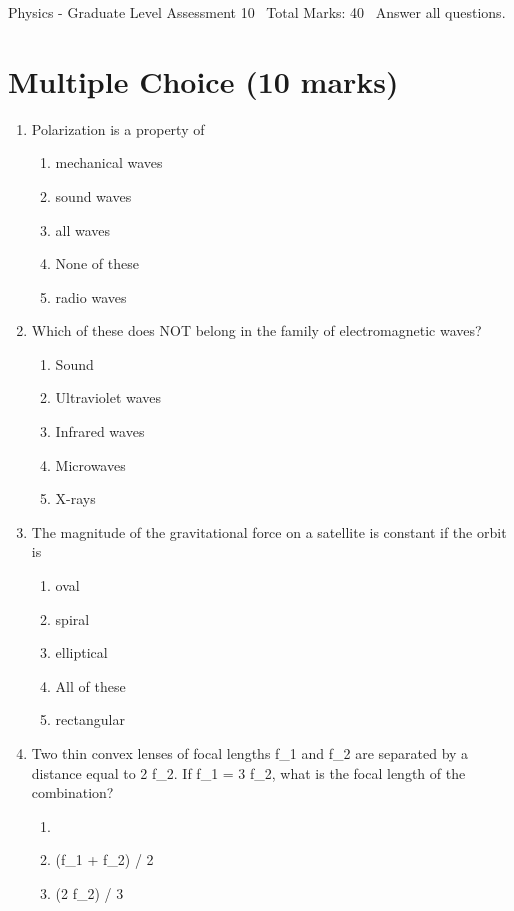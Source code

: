 \documentclass[12pt]{article}
\begin{document}
\begin{center}
Physics - Graduate Level Assessment 10 \
Total Marks: 40 \
Answer all questions.
\end{center}

\section*{Multiple Choice (10 marks)}
\begin{enumerate}[label=\arabic*.]
\item Polarization is a property of
\begin{enumerate}[label=(\alph*)]
    \item mechanical waves
    \item sound waves
    \item all waves
    \item None of these
    \item radio waves
\end{enumerate}
\item Which of these does NOT belong in the family of electromagnetic waves?
\begin{enumerate}[label=(\alph*)]
    \item Sound
    \item Ultraviolet waves
    \item Infrared waves
    \item Microwaves
    \item X-rays
\end{enumerate}
\item The magnitude of the gravitational force on a satellite is constant if the orbit is
\begin{enumerate}[label=(\alph*)]
    \item oval
    \item spiral
    \item elliptical
    \item All of these
    \item rectangular
\end{enumerate}
\item Two thin convex lenses of focal lengths f\_1 and f\_2 are separated by a distance equal to 2 f\_2. If f\_1 = 3 f\_2, what is the focal length of the combination?
\begin{enumerate}[label=(\alph*)]
    \item [(3 f\_2) / 2]
    \item (f\_1 + f\_2) / 2
    \item (2 f\_2) / 3

\end{enumerate}
\end{enumerate}
\end{document}
